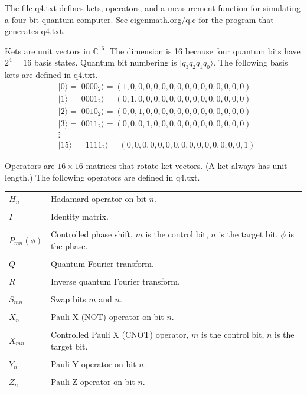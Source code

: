 \documentclass[12pt]{article}
\begin{document}
\noindent
The file q4.txt defines kets, operators, and a measurement function
for simulating a four bit quantum computer.
See eigenmath.org/q.c for the program that generates q4.txt.

\bigskip
\noindent
Kets are unit vectors in $\mathbb{C}^{16}$.
The dimension is 16 because four quantum bits have $2^4=16$ basis states.
Quantum bit numbering is $|q_3 q_2 q_1 q_0\rangle$.
The following basis kets are defined in q4.txt.
\begin{align*}
&|0\rangle=|0000_2\rangle=(1,0,0,0,0,0,0,0,0,0,0,0,0,0,0,0)
\\
&|1\rangle=|0001_2\rangle=(0,1,0,0,0,0,0,0,0,0,0,0,0,0,0,0)
\\
&|2\rangle=|0010_2\rangle=(0,0,1,0,0,0,0,0,0,0,0,0,0,0,0,0)
\\
&|3\rangle=|0011_2\rangle=(0,0,0,1,0,0,0,0,0,0,0,0,0,0,0,0)
\\
&\vdots
\\
&|15\rangle=|1111_2\rangle=(0,0,0,0,0,0,0,0,0,0,0,0,0,0,0,1)
\end{align*}

\noindent
Operators are $16\times16$ matrices that rotate ket vectors.
(A ket always has unit length.)
The following operators are defined in q4.txt.

\bigskip
\begin{tabular}{l l}
$H_n$ & Hadamard operator on bit $n$.
\\
\\
$I$ & Identity matrix.
\\
\\
$P_{mn}(\phi)$ & Controlled phase shift, $m$ is the control bit, $n$ is the target bit, $\phi$ is the phase.
\\
\\
$Q$ & Quantum Fourier transform.
\\
\\
$R$ & Inverse quantum Fourier transform.
\\
\\
$S_{mn}$ & Swap bits $m$ and $n$.
\\
\\
$X_n$ & Pauli X (NOT) operator on bit $n$.
\\
\\
$X_{mn}$ & Controlled Pauli X (CNOT) operator, $m$ is the control bit, $n$ is the target bit.
\\
\\
$Y_n$ & Pauli Y operator on bit $n$.
\\
\\
$Z_n$ & Pauli Z operator on bit $n$.
\end{tabular}
\end{document}
